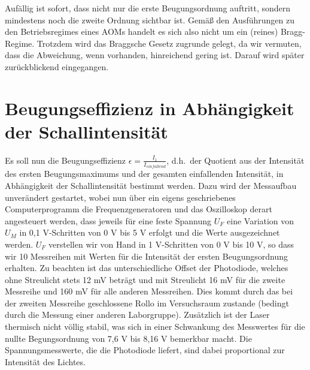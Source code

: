 \documentclass[bigchapter,colorback,accentcolor=tud4b,linedtoc,11pt]{tudreport}
\begin{document}
Aufällig ist sofort, dass nicht nur die erste Beugungsordnung auftritt, sondern mindestens noch die zweite Ordnung sichtbar ist. Gemäß den Ausführungen zu den Betriebsregimes eines AOMs handelt es sich also nicht um ein (reines) Bragg-Regime. Trotzdem wird das Braggsche Gesetz zugrunde gelegt, da wir vermuten, dass die Abweichung, wenn vorhanden, hinreichend gering ist. Darauf wird später zurückblickend eingegangen.

\section{Beugungseffizienz in Abhängigkeit der Schallintensität}

Es soll nun die Beugungseffizienz $\epsilon = \frac{I_1}{I_{einfallend}}$, d.h.\ der Quotient aus der Intensität des ersten Beugungsmaximums und der gesamten einfallenden Intensität, in Abhängigkeit der Schallintensität bestimmt werden. Dazu wird der Messaufbau unverändert gestartet, wobei nun über ein eigens geschriebenes Computerprogramm die Frequenzgeneratoren und das Oszilloskop derart angesteuert werden, dass jeweils für eine feste Spannung $U_F$ eine Variation von $U_M$ in 0,1 V-Schritten von 0 V bis 5 V erfolgt und die Werte ausgezeichnet werden. $U_F$ verstellen wir von Hand in 1 V-Schritten von 0 V bis 10 V, so dass wir 10 Messreihen mit Werten für die Intensität der ersten Beugungsordnung erhalten. Zu beachten ist das unterschiedliche Offset der Photodiode, welches ohne Streulicht stets 12 mV beträgt und mit Streulicht 16 mV für die zweite Messreihe und 160 mV für alle anderen Messreihen. Dies kommt durch das bei der zweiten Messreihe geschlossene Rollo im Versuchsraum zustande (bedingt durch die Messung einer anderen Laborgruppe). Zusätzlich ist der Laser thermisch nicht völlig stabil, was sich in einer Schwankung des Messwertes für die nullte Begungsordnung von 7,6 V bis 8,16 V bemerkbar macht. Die Spannungsmesswerte, die die Photodiode liefert, sind dabei proportional zur Intensität des Lichtes.
\end{document}
